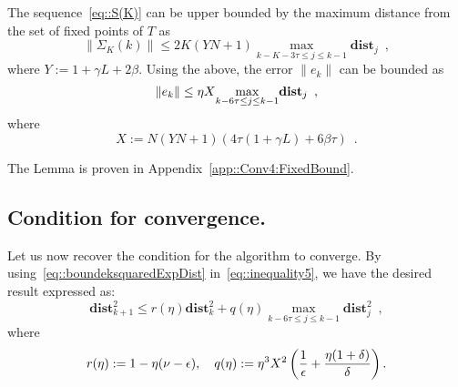 \documentclass[envcountsect]{svjour3}
\newcommand{\dist}{{\mathbf{dist} }}
\begin{document}
\begin{lemma}\label{lem::Conv4:FixedBound}
 The sequence~\eqref{eq::S(K)} can be upper bounded by the maximum distance from the set of fixed points of $T$ as
 \begin{equation*}
 \|\Sigma_K(k)\| \leq 2K(YN+1)\underset{k-K-3\tau \leq j \leq k-1}{\max}\dist_j\enspace,
\end{equation*}
where $Y:= 1+\gamma L+2\beta$.
Using the above, the error $\|e_k\|$ can be bounded as
\begin{equation}{\label{eq::boundeksquaredExpDist}}
 \|e_k\| \leq \eta X \underset{k-6\tau \leq j \leq k-1}{\max}\dist_j\enspace,
\end{equation}
where
 \[
 X := N(YN+1)(4\tau(1+\gamma L)+6\beta\tau)\enspace.
 \]
\end{lemma}
The Lemma is proven in Appendix~\ref{app::Conv4:FixedBound}.


\subsection{Condition for convergence. }
Let us now recover the condition for the algorithm to converge. By using~\eqref{eq::boundeksquaredExpDist} in~\eqref{eq::inequality5}, we have the desired result expressed as:
\begin{equation*}%
 \dist_{k+1}^2 \leq r(\eta)\dist_k^2 + q(\eta)\underset{k-6\tau \leq j \leq k-1}{\max}\dist_j^2 \enspace,
\end{equation*}
where
\begin{equation}{\label{eq::r_and_q}}
 r(\eta):= 1-\eta(\nu-\epsilon), \quad q(\eta):= \eta^3X^2\left(\frac{1}{\epsilon}+\frac{\eta(1+\delta)}{\delta}\right).
\end{equation}
\end{document}
